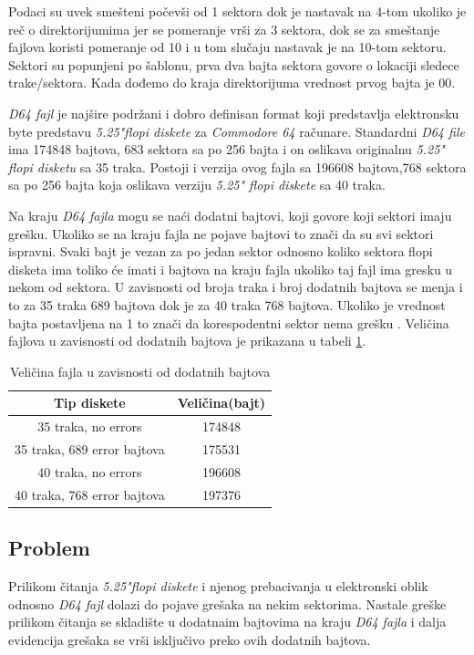 Podaci su uvek smešteni počevši od 1 sektora dok je nastavak na 4-tom ukoliko je reč o direktorijumima jer se pomeranje vrši za 3 sektora, dok se za smeštanje fajlova koristi pomeranje od 10 i u tom slučaju nastavak je na 10-tom sektoru. Sektori su popunjeni po šablonu, prva dva bajta sektora govore o lokaciji sledece trake/sektora. Kada dođemo do kraja direktorijuma vrednost prvog bajta je 00.

\textit{D64 fajl} je najšire podržani i dobro definisan format koji predstavlja elektronsku byte predstavu \textit{5.25"flopi diskete} za \textit{Commodore 64} računare. Standardni \textit{D64 file} ima 174848 bajtova, 683 sektora sa po 256 bajta i on oslikava originalnu \textit{5.25" flopi disketu} sa 35 traka.  Postoji i verzija ovog fajla sa 196608 bajtova,768 sektora sa po 256 bajta koja oslikava verziju \textit{5.25" flopi diskete} sa 40 traka.

Na kraju \textit{D64 fajla} mogu se naći dodatni bajtovi, koji govore koji sektori imaju grešku. Ukoliko se na kraju fajla ne pojave bajtovi to znači da su svi sektori ispravni. Svaki bajt je vezan za po jedan sektor odnosno koliko sektora flopi disketa ima toliko će imati i bajtova na kraju fajla ukoliko taj fajl ima gresku u nekom od sektora. U zavisnosti od broja traka i broj dodatnih bajtova se menja i to za 35 traka 689 bajtova dok je za 40 traka 768 bajtova. Ukoliko je vrednost bajta postavljena na 1 to znači da korespodentni sektor nema grešku \cite{D64}. Veličina fajlova u zavisnosti od dodatnih bajtova je prikazana u tabeli \ref{tab:error_velicina}.
\begin{table}[h!]
\begin{center}
\begin{tabular}{ | c | c |} 
\hline
Tip diskete & Veličina(bajt) \\
\hline
\hline
35 traka, no errors & 174848 \\
\hline
35 traka, 689 error bajtova & 175531 \\
\hline
40 traka, no errors & 196608 \\
\hline
40 traka, 768 error bajtova & 197376 \\
\hline
\end{tabular}
\end{center}
\caption{Veličina fajla u zavisnosti od dodatnih bajtova}
\label{tab:error_velicina}
\end{table}

\subsection{Problem}


Prilikom čitanja \textit{5.25"flopi diskete} i njenog prebacivanja u elektronski oblik odnosno \textit{D64 fajl} dolazi do pojave grešaka na nekim sektorima. Nastale greške prilikom čitanja se skladište u dodatnaim bajtovima na kraju \textit{D64 fajla} i dalja evidencija grešaka se vrši isključivo preko ovih dodatnih bajtova.